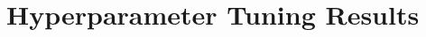 \chapter{Hyperparameter Tuning Results} %

\label{AppendixB} %

\lipsum[10]

\lipsum[12]

\lipsum[13]

\lipsum[14]

\lipsum[15]